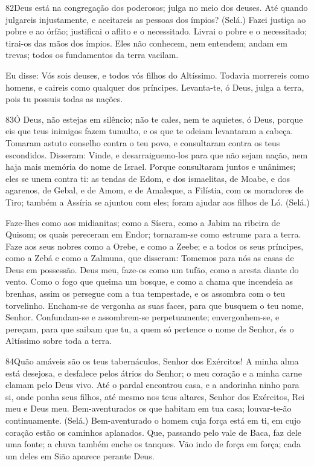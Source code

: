 \bigskip

\lettrine{82}{}Deus está na congregação dos poderosos; julga no
meio dos deuses. Até quando julgareis injustamente, e aceitareis
as pessoas dos ímpios? (Selá.) Fazei justiça ao pobre e ao
órfão; justificai o aflito e o necessitado. Livrai o pobre e o
necessitado; tirai-os das mãos dos ímpios. Eles não conhecem,
nem entendem; andam em trevas; todos os fundamentos da terra
vacilam.

Eu disse: Vós sois deuses, e todos vós filhos do Altíssimo.
Todavia morrereis como homens, e caireis como qualquer dos
príncipes. Levanta-te, ó Deus, julga a terra, pois tu possuis
todas as nações.

\bigskip

\lettrine{83}{}Ó Deus, não estejas em silêncio; não te cales,
nem te aquietes, ó Deus, porque eis que teus inimigos fazem
tumulto, e os que te odeiam levantaram a cabeça. Tomaram astuto
conselho contra o teu povo, e consultaram contra os teus escondidos.
Disseram: Vinde, e desarraiguemo-los para que não sejam nação,
nem haja mais memória do nome de Israel. Porque consultaram
juntos e unânimes; eles se unem contra ti: as tendas de Edom, e
dos ismaelitas, de Moabe, e dos agarenos, de Gebal, e de Amom, e
de Amaleque, a Filístia, com os moradores de Tiro; também a
Assíria se ajuntou com eles; foram ajudar aos filhos de Ló. (Selá.)

Faze-lhes como aos midianitas; como a Sísera, como a Jabim na
ribeira de Quisom; os quais pereceram em Endor; tornaram-se
como estrume para a terra. Faze aos seus nobres como a Orebe,
e como a Zeebe; e a todos os seus príncipes, como a Zebá e como a
Zalmuna, que disseram: Tomemos para nós as casas de Deus em
possessão. Deus meu, faze-os como um tufão, como a aresta
diante do vento. Como o fogo que queima um bosque, e como a
chama que incendeia as brenhas, assim os persegue com a tua
tempestade, e os assombra com o teu torvelinho. Encham-se de
vergonha as suas faces, para que busquem o teu nome, Senhor.
Confundam-se e assombrem-se perpetuamente; envergonhem-se, e
pereçam, para que saibam que tu, a quem só pertence o nome de
Senhor, és o Altíssimo sobre toda a terra.

\bigskip

\lettrine{84}{}Quão amáveis são os teus tabernáculos, Senhor
dos Exércitos! A minha alma está desejosa, e desfalece pelos
átrios do Senhor; o meu coração e a minha carne clamam pelo Deus
vivo. Até o pardal encontrou casa, e a andorinha ninho para si,
onde ponha seus filhos, até mesmo nos teus altares, Senhor dos
Exércitos, Rei meu e Deus meu. Bem-aventurados os que habitam em
tua casa; louvar-te-ão continuamente. (Selá.) Bem-aventurado o
homem cuja força está em ti, em cujo coração estão os caminhos
aplanados. Que, passando pelo vale de Baca, faz dele uma fonte;
a chuva também enche os tanques. Vão indo de força em força;
cada um deles em Sião aparece perante Deus.

